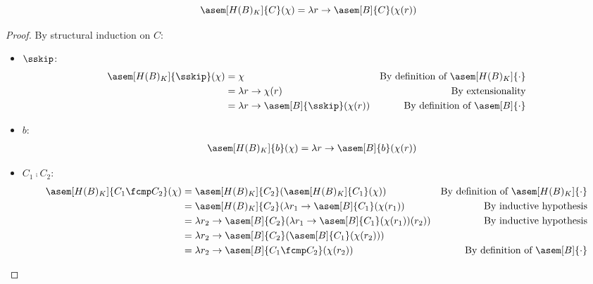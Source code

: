\begin{theorem}
    \label{thm:hyper-add}
    $$\asem[H(B)_K]{C}(\mathcal{\chi}) = \lambda r \to \asem[B]{C}(\chi(r))$$
\end{theorem}
\begin{proof}
  By structural induction on $C$:
  \begin{itemize}
    \item $\sskip$:
      \begin{align*}
        \asem[H(B)_K]{\sskip}(\chi) 
          &= \chi
          &\text{By definition of $\asem[H(B)_K]{\cdot}$} \\
          &= \lambda r \to \chi(r) 
          &\text{By extensionality}\\
          &= \lambda r \to \asem[B]{\sskip}(\chi(r))
          &\text{By definition of $\asem[B]{\cdot}$} \\
      \end{align*}

    \item $b$:
      \begin{align*}
        \asem[H(B)_K]{b}(\chi) 
          &= \lambda r \to \asem[B]{b}(\chi(r))
      \end{align*}

    \item $C_1 \fcmp C_2$:
      \begin{align*}
        \asem[H(B)_K]{C_1 \fcmp C_2}(\chi) 
          &= \asem[H(B)_K]{C_2}(\asem[H(B)_K]{C_1}(\chi))
          &\text{By definition of $\asem[H(B)_K]{\cdot}$} \\
          &= \asem[H(B)_K]{C_2}(\lambda r_1 \to 
            \asem[B]{C_1}(\chi(r_1))
          &\text{By inductive hypothesis} \\
          &= \lambda r_2 \to \asem[B]{C_2}(\lambda r_1 \to 
            \asem[B]{C_1}(\chi(r_1))(r_2))
          &\text{By inductive hypothesis} \\
          &= \lambda r_2 \to 
            \asem[B]{C_2}(\asem[B]{C_1}(\chi(r_2))) \\
          &= \lambda r_2 \to \asem[B]{C_1 \fcmp C_2}(\chi(r_2))
          &\text{By definition of $\asem[B]{\cdot}$} \\
      \end{align*}


\end{itemize}
\end{proof}
